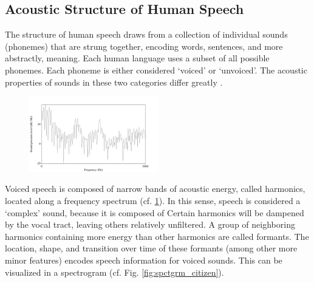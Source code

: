

\subsection{Acoustic Structure of Human Speech}

The structure of human speech draws from a collection of individual sounds (phonemes) that are strung together, encoding words, sentences, and more abstractly, meaning.  Each human language uses a subset of all possible phonemes.  Each phoneme is either considered `voiced' or `unvoiced'.  The acoustic properties of sounds in these two categories differ greatly \DIFaddbegin {}\DIFaddend .


\DIFaddbegin \begin{figure}
\centering
  \includegraphics[width=0.5\textwidth]{figure/spctrm5k.png}
  \caption{}
  \label{fig:spctrm5k}
\end{figure}
\DIFaddend Voiced speech is composed of narrow bands of acoustic energy, called harmonics, located along a frequency spectrum (cf. \DIFdelbegin {}\DIFdelend \DIFaddbegin {}\DIFaddend \ref{fig:spctrm5k}).  In this sense, speech is considered a `complex' sound, because it is composed of \DIFdelbegin {}%
{%
}
\DIFdelend \DIFaddbegin {}\DIFaddend Certain harmonics will be dampened by the vocal tract, leaving others relatively unfiltered.  A group of neighboring harmonics containing more energy than other harmonics are called formants.  The location, shape, and transition over time of these formants (among other more minor features) \DIFdelbegin {}\DIFdelend encodes speech information for voiced sounds.  This can be \DIFdelbegin {}\DIFdelend visualized in a spectrogram (cf. Fig. \ref{fig:spctgrm_citizen}).


